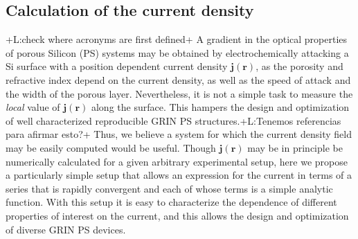 \documentclass{article}
\newcommand{\notaL}[1]{{\color{blue}+L:#1+}}
\begin{document}
\subsection{Calculation of the current density}
\notaL{check where acronyms are first defined}
A gradient in the optical properties of porous Silicon (PS) systems may be
obtained by electrochemically attacking a Si surface with a position dependent current
density ${\bm j(\bm r)}$, as the porosity and refractive index depend on
the current density, as well as the speed of attack and the width of the
porous layer. Nevertheless, it is not a simple task to measure the
{\em local} value of $\bm j(\bm r)$ along the surface. This hampers the
design and optimization of well characterized reproducible GRIN PS
structures.\notaL{Tenemos referencias para afirmar esto?} Thus, we
believe a
system for which the current density field may be
easily computed would be useful.
Though $\bm j(\bm r)$ may be in principle be numerically calculated for a
given arbitrary experimental setup,  here we propose a particularly
simple setup that allows an expression for the current in terms
of a series that is rapidly convergent and each of whose terms is a
simple analytic function. With this setup it is easy to characterize
the dependence of different properties of interest on the current, and
this allows the design and optimization of diverse GRIN PS devices.
\end{document}
